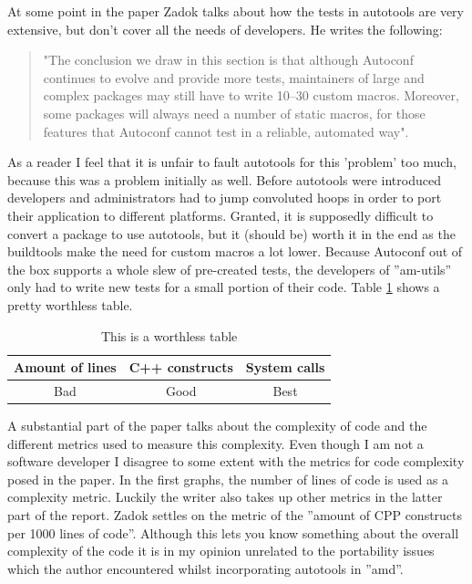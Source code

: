 At some point in the paper Zadok talks about how the tests in autotools are very extensive, but don't cover all the needs of developers. He writes the following:

\begin{quotation}
"The conclusion we draw in this section is that although Autoconf continues to evolve and provide more tests, maintainers of large and complex packages may still have to write 10–30 custom macros. Moreover, some packages will always need a number of static macros, for those features that Autoconf cannot test in a reliable, automated way".
\end{quotation}

As a reader I feel that it is unfair to fault autotools for this 'problem' too much, because this was a problem initially as well. Before autotools were introduced developers and administrators had to jump convoluted hoops in order to port their application to different platforms. Granted, it is supposedly difficult to convert a package to use autotools, but it (should be) worth it in the end as the buildtools make the need for custom macros a lot lower. Because Autoconf out of the box supports a whole slew of pre-created tests, the developers of ''am-utils'' only had to write new tests for a small portion of their code. Table \ref{table:worthlesstable} shows a pretty worthless table.

\begin{table}[H]
	\center
	\begin{tabular}{|c|c|c|}
	\hline 
	\textbf{Amount of lines} & \textbf{C++ constructs} & \textbf{System calls} \\ 
	\hline 
	Bad & Good & Best \\ 
	\hline 
	\end{tabular}
	\caption{This is a worthless table}
	\label{table:worthlesstable}
\end{table}

A substantial part of the paper talks about the complexity of code and the different metrics used to measure this complexity. Even though I am not a software developer I disagree to some extent with the metrics for code complexity posed in the paper. In the first graphs, the number of lines of code is used as a complexity metric. Luckily the writer also takes up other metrics in the latter part of the report. Zadok settles on the metric of the ''amount of CPP constructs per 1000 lines of code''. Although this lets you know something about the overall complexity of the code it is in my opinion unrelated to the portability issues which the author encountered whilst incorporating autotools in ''amd''. 

